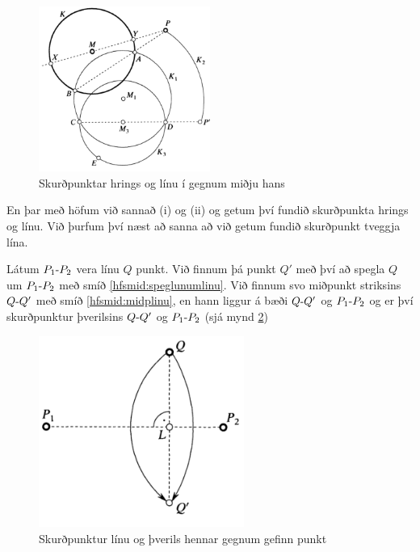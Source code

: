 \begin{frame}
  \begin{figure}[H]
    \centering
    \includegraphics[width=0.5\textwidth]{MohrMaschCon3.png}
    \caption{Skurðpunktar hrings og línu í gegnum miðju hans}
    \label{fig:mmcon3}
  \end{figure}
\end{frame}

\begin{frame}
  En þar með höfum við sannað (i) og (ii) og getum því fundið skurðpunkta
  hrings og línu. Við þurfum því næst að sanna að við getum fundið skurðpunkt
  tveggja lína.
\end{frame}

\begin{frame}
  \begin{hfsmid} \label{hfsmid:skplinuoghornrettarlinu}
    Látum \(\lin{P_1}{P_2}\) vera línu \(Q\) punkt. Við finnum þá punkt \(Q'\)
    með því að spegla \(Q\) um \(\lin{P_1}{P_2}\) með smíð \ref{hfsmid:speglunumlinu}.
    Við finnum svo miðpunkt striksins \(\lin{Q}{Q'}\) með smíð \ref{hfsmid:midplinu},
    en hann liggur á bæði \(\lin{Q}{Q'}\) og \(\lin{P_1}{P_2}\) og er því skurðpunktur
    þverilsins \(\lin{Q}{Q'}\) og \(\lin{P_1}{P_2}\) (sjá mynd \ref{fig:mmcon4})
  \end{hfsmid}
\end{frame}


\begin{frame}
  \begin{figure}[H]
    \centering
    \includegraphics[width=0.6\textwidth]{MohrMaschCon4.png}
    \caption{Skurðpunktur línu og þverils hennar gegnum gefinn punkt}
    \label{fig:mmcon4}
  \end{figure}
\end{frame}

